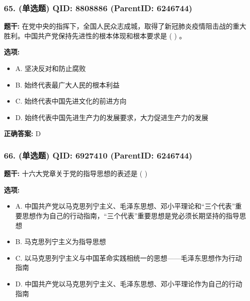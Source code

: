 \documentclass[12pt,UTF8]{ctexart}
\begin{document}
\subsubsection*{65. (单选题) \small QID: 8808886 (ParentID: 6246744)}

\textbf{题干:}
在党中央的指挥下，全国人民众志成城，取得了新冠肺炎疫情阻击战的重大胜利。中国共产党保持先进性的根本体现和根本要求是 ( ) 。



\textbf{选项:}
\begin{itemize}[leftmargin=*]

  \item A. 坚决反对和防止腐败

  \item B. 始终代表最广大人民的根本利益

  \item C. 始终代表中国先进文化的前进方向

  \item D. 始终代表中国先进生产力的发展要求，大力促进生产力的发展

\end{itemize}

\textbf{正确答案:}
D

\vspace{0.3em}\hrulefill\vspace{0.7em}

\subsubsection*{66. (单选题) \small QID: 6927410 (ParentID: 6246744)}

\textbf{题干:}
十六大党章关于党的指导思想的表述是 ( )



\textbf{选项:}
\begin{itemize}[leftmargin=*]

  \item A. 中国共产党以马克思列宁主义、毛泽东思想、邓小平理论和“三个代表”重要思想作为自己的行动指南，“三个代表”重要思想是党必须长期坚持的指导思想

  \item B. 马克思列宁主义为指导思想

  \item C. 以马克思列宁主义与中国革命实践相统一的思想——毛泽东思想作为行动指南

  \item D. 中国共产党以马克思列宁主义、毛泽东思想、邓小平理论作为自己的行动指南

\end{itemize}
\end{document}
